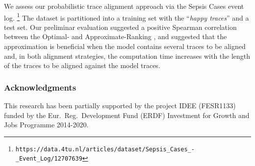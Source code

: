 We assess our probabilistic trace alignment approach via the Sepsis Cases event log.%
\footnote{{\small \texttt{\tiny https://data.4tu.nl/articles/dataset/Sepsis\_Cases\_-\_Event\_Log/12707639}}} 
The dataset is partitioned into a training set with the ``\textit{happy traces}''  %
and a test set. %
Our preliminar evaluation suggested a positive Spearman correlation between the Optimal- and Approximate-Ranking \cite{BergamiBM20}, and suggested that the approximation is beneficial when the model contains several traces to be aligned and, in 
both alignment strategies, the computation time increases with the length of the traces to be aligned against the model traces.

\vspace*{-0.7cm}
\subsubsection*{Acknowledgments}
This research has been partially supported by the project IDEE (FESR1133) funded by the Eur.\ Reg.\ Development Fund (ERDF) Investment for Growth and Jobs Programme 2014-2020. 